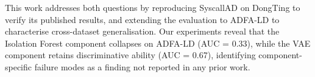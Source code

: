 This work addresses both questions by reproducing SyscallAD on DongTing to verify its
published results, and extending the evaluation to ADFA-LD to characterise cross-dataset
generalisation. Our experiments reveal that the Isolation Forest component collapses on
ADFA-LD (AUC = 0.33), while the VAE component retains discriminative ability
(AUC = 0.67), identifying component-specific failure modes as a finding not reported in
any prior work.
